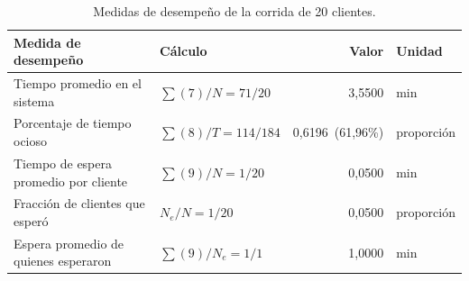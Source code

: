 \begin{table}[H]
\centering
\caption{Medidas de desempe\~no de la corrida de 20 clientes.}
\label{tab:med20}
\small
\begin{tabular}{@{}llrl@{}}
\toprule
Medida de desempe\~no & C\'alculo & Valor & Unidad \\
\midrule
Tiempo promedio en el sistema & $\sum(7)/N = 71/20$ & 3,5500 & min \\
Porcentaje de tiempo ocioso & $\sum(8)/T = 114/184$ & 0,6196\ (61,96\%) & proporci\'on \\
Tiempo de espera promedio por cliente & $\sum(9)/N = 1/20$ & 0,0500 & min \\
Fracci\'on de clientes que esper\'o & $N_e/N = 1/20$ & 0,0500 & proporci\'on \\
Espera promedio de quienes esperaron & $\sum(9)/N_e = 1/1$ & 1,0000 & min \\
\bottomrule
\end{tabular}
\end{table}